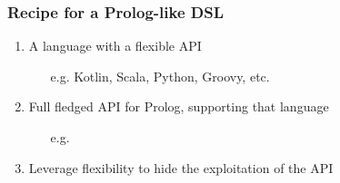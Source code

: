 \documentclass[presentation]{beamer}
\begin{document}
\begin{frame}%
\frametitle{Recipe for a Prolog-like DSL}

    \begin{enumerate}
        \item A language with a flexible API
        \begin{itemize}
            \item[e.g.] Kotlin, Scala, Python, Groovy, etc.
        \end{itemize}

        \vfill

        \item Full fledged API for Prolog, supporting that language
        \begin{itemize}
            \item[e.g.] \twopkt{} 
        \end{itemize}

        \vfill

        \item Leverage flexibility to hide the exploitation of the API
    \end{enumerate}

\end{frame}
\end{document}
